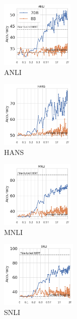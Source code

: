 \begin{figure}[t]
    \begin{subfigure}[b]{0.20\textwidth}
    \centering
    \includegraphics[height=3.2cm]{figures/anli_intermediate}
    \caption{ANLI}
    \end{subfigure}
    \label{fig:anli_int}
    \begin{subfigure}[b]{0.19\textwidth}
    \centering
    \includegraphics[height=3.2cm, trim=11mm 0 0 0, clip]{figures/hansnli_intermediate}
    \caption{HANS}
    \label{fig:hans_int}
    \end{subfigure}
    \begin{subfigure}[b]{0.19\textwidth}
    \centering
    \includegraphics[height=3.2cm, trim=11mm 0 0 0, clip]{figures/mnli_matched_intermediate}
    \caption{MNLI}
    \label{fig:mnli_int}
    \end{subfigure}
    \begin{subfigure}[b]{0.19\textwidth}
    \centering
    \includegraphics[height=3.2cm, trim=11mm 0 0 0, clip]{figures/snli_intermediate}
    \caption{SNLI}
    \label{fig:snli_int}
    \end{subfigure}
    \begin{subfigure}[b]{0.19\textwidth}

\end{subfigure}
\end{figure}

